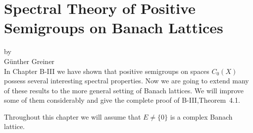 \chapter[Spectral Theory on Banach Lattices]{Spectral Theory of Positive Semigroups on Banach Lattices}\label{chap:c3}
{\Large
\vspace*{-.75cm}
by \\[.25em]
Günther Greiner
\vspace{.75cm}
\\
}
In Chapter B-III we have shown that positive semigroups on spaces $C_{0}(X)$ possess several interesting spectral properties.
Now we are going to extend many of these results to the more general setting of Banach lattices.
We will improve some of them considerably and give the complete proof of B-III,Theorem~4.1.

Throughout this chapter we will assume that $E \neq \{0\}$ is a complex Banach lattice.

